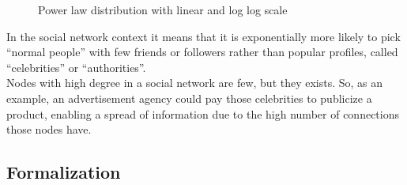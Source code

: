     \begin{figure}[h!]
        \centering
        \hskip 7pt
        \caption{Power law distribution with linear and log log scale}
        \label{fig:power-law}
    \end{figure}

    In the social network context it means that it is exponentially more likely to pick ``normal people'' with few friends or followers rather than popular profiles, called ``celebrities'' or ``authorities''.\\
    Nodes with high degree in a social network are few, but they exists. So, as an example, an advertisement agency could pay those celebrities to publicize a product, enabling a spread of information due to the high number of connections those nodes have.
    
    
\subsection{Formalization}\label{sec:pref-attach-formalization}

